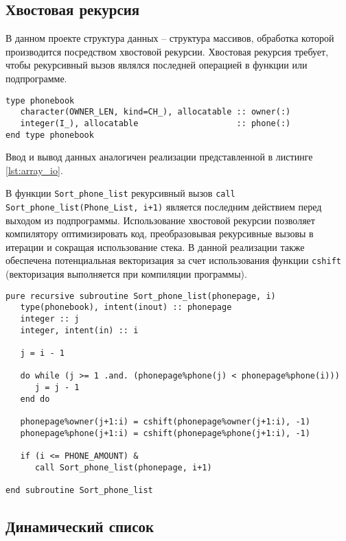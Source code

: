 \documentclass[a4paper,14pt]{article}
\begin{document}
\subsection{Хвостовая рекурсия}

В данном проекте структура данных – структура массивов, обработка которой производится посредством хвостовой рекурсии. Хвостовая рекурсия требует, чтобы рекурсивный вызов являлся последней операцией в функции или подпрограмме.

\begin{lstlisting}[caption={Структура для хранения данных}]
type phonebook
   character(OWNER_LEN, kind=CH_), allocatable :: owner(:)
   integer(I_), allocatable                    :: phone(:)
end type phonebook
\end{lstlisting}

Ввод и вывод данных аналогичен реализации представленной в листинге \ref{lst:array_io}.

В функции \texttt{Sort\_phone\_list} рекурсивный вызов \texttt{call Sort\_phone\_list(Phone\_List, i+1)} является последним действием перед выходом из подпрограммы. 
Использование хвостовой рекурсии позволяет компилятору оптимизировать код, преобразовывая рекурсивные вызовы в итерации и сокращая использование стека. В данной реализации также обеспечена потенциальная векторизация за счет использования функции \texttt{cshift} (векторизация выполняется при компиляции программы).

\begin{lstlisting}[caption={Реализация сортировки с использованием хвостовой рекурсии}]
pure recursive subroutine Sort_phone_list(phonepage, i)
   type(phonebook), intent(inout) :: phonepage
   integer :: j
   integer, intent(in) :: i

   j = i - 1

   do while (j >= 1 .and. (phonepage%phone(j) < phonepage%phone(i)))
      j = j - 1
   end do

   phonepage%owner(j+1:i) = cshift(phonepage%owner(j+1:i), -1)
   phonepage%phone(j+1:i) = cshift(phonepage%phone(j+1:i), -1)
   
   if (i <= PHONE_AMOUNT) &
      call Sort_phone_list(phonepage, i+1)

end subroutine Sort_phone_list
\end{lstlisting}

\subsection{Динамический список}
\end{document}
